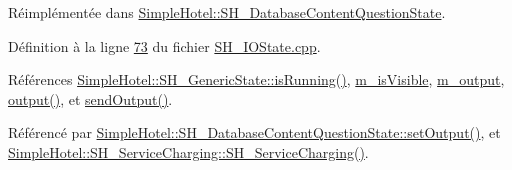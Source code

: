 Réimplémentée dans \hyperlink{classSimpleHotel_1_1SH__DatabaseContentQuestionState_ab85498797a0318417580ad3f274b018a}{Simple\-Hotel\-::\-S\-H\-\_\-\-Database\-Content\-Question\-State}.



Définition à la ligne \hyperlink{SH__IOState_8cpp_source_l00073}{73} du fichier \hyperlink{SH__IOState_8cpp_source}{S\-H\-\_\-\-I\-O\-State.\-cpp}.



Références \hyperlink{classSimpleHotel_1_1SH__GenericState_a5151ff071129bdd4dcf7c60cb93794da}{Simple\-Hotel\-::\-S\-H\-\_\-\-Generic\-State\-::is\-Running()}, \hyperlink{classSimpleHotel_1_1SH__InOutState_a041ad53f3cdfb1b18ee002597e833848}{m\-\_\-is\-Visible}, \hyperlink{classSimpleHotel_1_1SH__InOutState_ab3dc360d32c8da2b958f8cdda90a8518}{m\-\_\-output}, \hyperlink{classSimpleHotel_1_1SH__InOutState_a71b15e4d49b9c2aa540500065ceb39da}{output()}, et \hyperlink{classSimpleHotel_1_1SH__InOutState_a6f39ba3a9682ece4a0d2c96e8f8983a0}{send\-Output()}.



Référencé par \hyperlink{classSimpleHotel_1_1SH__DatabaseContentQuestionState_ab85498797a0318417580ad3f274b018a}{Simple\-Hotel\-::\-S\-H\-\_\-\-Database\-Content\-Question\-State\-::set\-Output()}, et \hyperlink{classSimpleHotel_1_1SH__ServiceCharging_ae82c86c7e955f0dc93cdfc3603789b87}{Simple\-Hotel\-::\-S\-H\-\_\-\-Service\-Charging\-::\-S\-H\-\_\-\-Service\-Charging()}.


